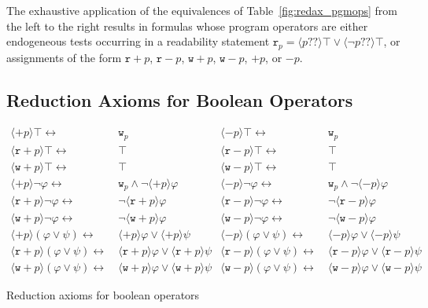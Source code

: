 \documentclass{llncs}
\newcommand{\readable}[1]{\mathtt{r}_{#1}}
\newcommand{\writable}[1]{\mathtt{w}_{#1}}
\newcommand{\testendo}{?\!\!?}			%
\newcommand{\assgntopR}[1]{{\mathtt r {+} #1}}
\newcommand{\assgnbotR}[1]{{\mathtt r {-} #1}}
\newcommand{\assgntopW}[1]{{\mathtt w {+} #1}}
\newcommand{\assgnbotW}[1]{{\mathtt w {-} #1}}
\newcommand{\assgntopV}[1]{{\mathtt {+} #1}}
\newcommand{\assgnbotV}[1]{{\mathtt {-} #1}}
\newcommand{\ldia}[1]{ \big\langle #1 \big\rangle}
\newcommand{\leqv}{ \leftrightarrow }
\renewcommand{\phi}{\varphi}
\begin{document}
The exhaustive application of the equivalences of Table~\ref{fig:redax_pgmops} from the left to the right 
results in formulas whose program operators are either endogeneous tests occurring in a readability statement
$\readable p = \ldia{p \testendo} \top \lor \ldia{\lnot p \testendo} \top$, or 
assignments of the form
$\assgntopR p $, $\assgnbotR p $,
$\assgntopW p $, $\assgnbotW p $, 
$\assgntopV p $, or $\assgnbotV p $. 


\subsection{Reduction Axioms for Boolean Operators}\label{sec:redax_atmpgm_bool} 

\begin{table}[t]
\begin{align*}
\ldia{\assgntopV p} \top \leqv &\  \writable p
& \ldia{\assgnbotV p} \top \leqv &\  \writable p
\\
\ldia{\assgntopR p} \top \leqv &\ \top
& \ldia{\assgnbotR p} \top \leqv &\ \top
\\
\ldia{\assgntopW p} \top \leqv &\ \top
& \ldia{\assgnbotW p} \top \leqv &\ \top
%
\\
\ldia{\assgntopV p } \lnot \phi \leqv &\ 
					\writable{p} \land \lnot \ldia{\assgntopV p } \phi  
& \ldia{\assgnbotV p } \lnot \phi \leqv &\ 
					\writable{p} \land \lnot \ldia{\assgnbotV p } \phi 
\\
\ldia{\assgntopR p } \lnot \phi \leqv &\ 
					\lnot \ldia{\assgntopR p } \phi  
& \ldia{\assgnbotR p } \lnot \phi \leqv &\ 
					\lnot \ldia{\assgnbotR p } \phi 
\\
\ldia{\assgntopW p } \lnot \phi \leqv &\ 
					\lnot \ldia{\assgntopW p } \phi  
& \ldia{\assgnbotW p } \lnot \phi \leqv &\ 
					\lnot \ldia{\assgnbotW p } \phi 
%
\\
\ldia{\assgntopV p } (\phi \lor \psi) \leqv &\ \ldia{\assgntopV p } \phi \lor \ldia{\assgntopV p } \psi 
& \ldia{\assgnbotV p } (\phi \lor \psi) \leqv &\ \ldia{\assgnbotV p } \phi \lor \ldia{\assgnbotV p } \psi 
\\
\ldia{\assgntopR p } (\phi \lor \psi) \leqv &\ \ldia{\assgntopR p } \phi \lor \ldia{\assgntopR p } \psi 
& \ldia{\assgnbotR p } (\phi \lor \psi) \leqv &\ \ldia{\assgnbotR p } \phi \lor \ldia{\assgnbotR p } \psi 
\\
\ldia{\assgntopW p } (\phi \lor \psi) \leqv &\ \ldia{\assgntopW p } \phi \lor \ldia{\assgntopW p } \psi 
& \ldia{\assgnbotW p } (\phi \lor \psi) \leqv &\ \ldia{\assgnbotW p } \phi \lor \ldia{\assgnbotW p } \psi 
\end{align*}
\caption{Reduction axioms for boolean operators
\label{fig:redax_booleanops}
}
\end{table}
\end{document}

